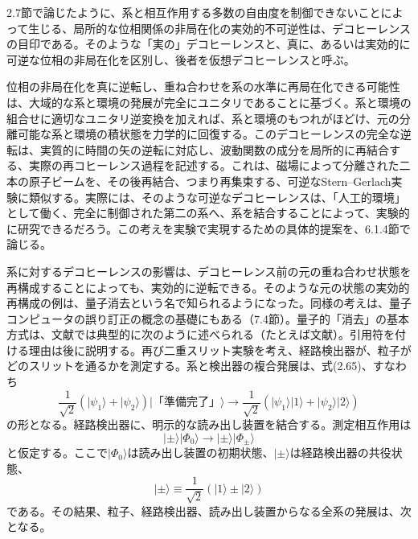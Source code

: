 

2.7節で論じたように、系と相互作用する多数の自由度を制御できないことによって生じる、局所的な位相関係の非局在化の実効的不可逆性は、デコヒーレンスの目印である。そのような「実の」デコヒーレンスと、真に、あるいは実効的に可逆な位相の非局在化を区別し、後者を仮想デコヒーレンスと呼ぶ。

\hypertarget{srcpage:99}{}\label{srcpage:99}
位相の非局在化を真に逆転し、重ね合わせを系の水準に再局在化できる可能性は、大域的な系と環境の発展が完全にユニタリであることに基づく。系と環境の組合せに適切なユニタリ逆変換を加えれば、系と環境のもつれがほどけ、元の分離可能な系と環境の積状態を力学的に回復する。このデコヒーレンスの完全な逆転は、実質的に時間の矢の逆転に対応し、波動関数の成分を局所的に再結合する、実際の再コヒーレンス過程を記述する。これは、磁場によって分離された二本の原子ビームを、その後再結合、つまり再集束する、可逆なStern--Gerlach実験\cite{ref126,ref127}に類似する。実際には、そのような可逆なデコヒーレンスは、「人工的環境」として働く、完全に制御された第二の系へ、系を結合することによって、実験的に研究できるだろう。この考えを実験で実現するための具体的提案を、6.1.4節で論じる。

系に対するデコヒーレンスの影響は、デコヒーレンス前の元の重ね合わせ状態を再構成することによっても、実効的に逆転できる。そのような元の状態の実効的再構成の例は、量子消去という名で知られるようになった\cite{ref075,ref128,ref129,ref130}。同様の考えは、量子コンピュータの誤り訂正の概念の基礎にもある（7.4節）。量子的「消去」の基本方式は、文献では典型的に次のように述べられる（たとえば文献\cite{ref130}）。引用符を付ける理由は後に説明する。再び二重スリット実験を考え、経路検出器が、粒子がどのスリットを通るかを測定する。系と検出器の複合発展は、式(2.65)、すなわち
\begin{equation}\frac1{\sqrt2}(\lvert\psi_1\rangle+\lvert\psi_2\rangle)\lvert\text{「準備完了」}\rangle\longrightarrow\frac1{\sqrt2}(\lvert\psi_1\rangle\lvert1\rangle+\lvert\psi_2\rangle\lvert2\rangle)\tag{2.122}\end{equation}
の形となる。経路検出器に、明示的な読み出し装置を結合する。測定相互作用は
\begin{equation}\lvert\pm\rangle\lvert\Phi_0\rangle\longrightarrow\lvert\pm\rangle\lvert\Phi_\pm\rangle\tag{2.123}\end{equation}
と仮定する。ここで$\lvert\Phi_0\rangle$は読み出し装置の初期状態、$\lvert\pm\rangle$は経路検出器の共役状態、
\begin{equation}\lvert\pm\rangle\equiv\frac1{\sqrt2}(\lvert1\rangle\pm\lvert2\rangle)\tag{2.124}\end{equation}
である。その結果、粒子、経路検出器、読み出し装置からなる全系の発展は、次となる。

